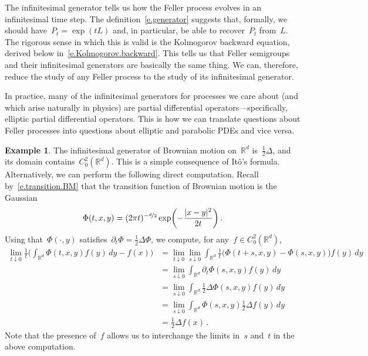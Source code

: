 \documentclass[11pt,twoside]{article} %
\numberwithin{equation}{section}
\theoremstyle{definition}
\newtheorem{example}[theorem]{Example}
\newcommand*{\Rd}{\ensuremath{\mathbb{R}^d}}
\begin{document}
The infinitesimal generator tells us how the Feller process evolves in an infinitesimal time step. The definition~\eqref{e.generator} suggests that, formally, we should have~$P_t = \exp(tL)$ and, in particular, be able to recover~$P_t$ from~$L$. The rigorous sense in which this is valid is the Kolmogorov backward equation, derived below in~\eqref{e.Kolmogorov.backward}. This tells us that Feller semigroups and their infinitesimal generators are basically the same thing. We can, therefore, reduce the study of any Feller process to the study of its infinitesimal generator.

\smallskip

In practice, many of the infinitesimal generators for processes we care about (and which arise naturally in physics) are partial differential operators---specifically, elliptic partial differential operators. This is how we can translate questions about Feller processes into questions about elliptic and parabolic PDEs and vice versa. 

\begin{example} 
The infinitesimal generator of Brownian motion on~$\Rd$ is~$\frac12\Delta$, and its domain contains~$C^2_0(\Rd)$. This is a simple consequence of It\^o's formula. 
Alternatively, we can perform the following direct computation. Recall by~\eqref{e.transition.BM} that the transition function of Brownian motion is the Gaussian
\begin{equation*}
\Phi(t,x,y) = (2\pi t)^{-\nicefrac d2} \exp\biggl( -\frac{|x-y|^2}{2t} \biggr)\,.
\end{equation*}
Using that~$\Phi(\cdot,y)$ satisfies~$\partial_t \Phi = \frac12 \Delta \Phi$, 
we compute, for any~$f\in C^2_0(\Rd)$, 
\begin{align*}
\lim_{t\downarrow 0} 
\frac1t \biggl( \int_{\Rd} \Phi(t,x,y) f(y)\,dy - f(x)  \biggr) 
&
= 
\lim_{t\downarrow 0} 
\lim_{s \downarrow 0} 
\int_{\Rd} \frac1t \bigl(\Phi(t+s,x,y) - \Phi(s,x,y)\bigr) f(y) \,dy
\\ &
=
\lim_{s\downarrow 0} 
\int_{\Rd} \partial_t \Phi(s,x,y)f(y) \,dy
\\ & 
=
\lim_{s\downarrow 0} 
\int_{\Rd} \frac12 \Delta \Phi(s,x,y) f(y) \,dy
\\ & 
=
\lim_{s\downarrow 0} 
\int_{\Rd} \Phi(s,x,y) \frac12 \Delta f(y) \,dy
\\ & 
=
\frac12 \Delta f(x) 
\,.
\end{align*}
Note that the presence of~$f$ allows us to interchange the limits in~$s$ and~$t$ in the above computation. 
\end{example}
\end{document}
